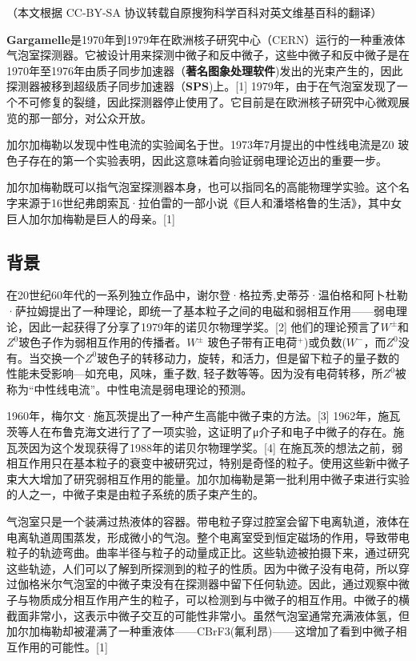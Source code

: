 
（本文根据 CC-BY-SA 协议转载自原搜狗科学百科对英文维基百科的翻译）

\textbf{Gargamelle}是1970年到1979年在欧洲核子研究中心（CERN）运行的一种重液体气泡室探测器。它被设计用来探测中微子和反中微子，这些中微子和反中微子是在1970年至1976年由质子同步加速器（\textbf{著名图象处理软件})发出的光束产生的，因此探测器被移到超级质子同步加速器（\textbf{SPS})上。[1] 1979年，由于在气泡室发现了一个不可修复的裂缝，因此探测器停止使用了。它目前是在欧洲核子研究中心微观展览的那一部分，对公众开放。

加尔加梅勒以发现中性电流的实验闻名于世。1973年7月提出的中性线电流是Z0 玻色子存在的第一个实验表明，因此这意味着向验证弱电理论迈出的重要一步。

加尔加梅勒既可以指气泡室探测器本身，也可以指同名的高能物理学实验。这个名字来源于16世纪弗朗索瓦·拉伯雷的一部小说《巨人和潘塔格鲁的生活》，其中女巨人加尔加梅勒是巨人的母亲。[1]

\subsection{背景}
在20世纪60年代的一系列独立作品中，谢尔登·格拉秀,史蒂芬·温伯格和阿卜杜勒·萨拉姆提出了一种理论，即统一了基本粒子之间的电磁和弱相互作用——弱电理论，因此一起获得了分享了1979年的诺贝尔物理学奖。[2] 他们的理论预言了$W^\pm$和$Z^0$玻色子作为弱相互作用的传播者。$W^\pm$ 玻色子带有正电荷$^{+}$)或负数($W^−$，而$Z^0$没有。当交换一个$Z^0$玻色子的转移动力，旋转，和活力，但是留下粒子的量子数的性能未受影响—如充电，风味，重子数, 轻子数等等。因为没有电荷转移，所$Z^0$被称为“中性线电流”。中性电流是弱电理论的预测。

1960年，梅尔文·施瓦茨提出了一种产生高能中微子束的方法。[3] 1962年，施瓦茨等人在布鲁克海文进行了了一项实验，这证明了μ介子和电子中微子的存在。施瓦茨因为这个发现获得了1988年的诺贝尔物理学奖。[4] 在施瓦茨的想法之前，弱相互作用只在基本粒子的衰变中被研究过，特别是奇怪的粒子。使用这些新中微子束大大增加了研究弱相互作用的能量。加尔加梅勒是第一批利用中微子束进行实验的人之一，中微子束是由粒子系统的质子束产生的。

气泡室只是一个装满过热液体的容器。带电粒子穿过腔室会留下电离轨道，液体在电离轨道周围蒸发，形成微小的气泡。整个电离室受到恒定磁场的作用，导致带电粒子的轨迹弯曲。曲率半径与粒子的动量成正比。这些轨迹被拍摄下来，通过研究这些轨迹，人们可以了解到所探测到的粒子的性质。因为中微子没有电荷，所以穿过伽格米尔气泡室的中微子束没有在探测器中留下任何轨迹。因此，通过观察中微子与物质成分相互作用产生的粒子，可以检测到与中微子的相互作用。中微子的横截面非常小，这表示中微子交互的可能性非常小。虽然气泡室通常充满液体氢，但加尔加梅勒却被灌满了一种重液体——CBrF3(氟利昂)——这增加了看到中微子相互作用的可能性。[1]